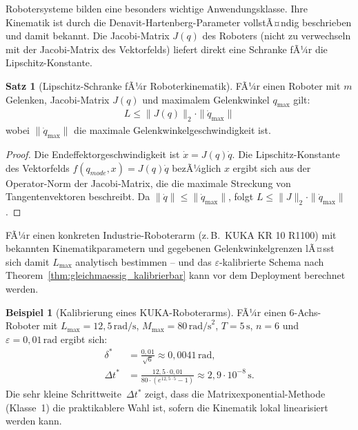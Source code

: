 ﻿\documentclass[a4paper,12pt]{article}
\theoremstyle{definition}
\newtheorem{beispiel}{Beispiel}[section]
\newtheorem{satz}{Satz}[section]
\begin{document}
Robotersysteme bilden eine besonders wichtige Anwendungsklasse. Ihre Kinematik ist durch die Denavit-Hartenberg-Parameter vollstÃ¤ndig beschrieben und damit bekannt. Die Jacobi-Matrix $J(q)$ des Roboters (nicht zu verwechseln mit der Jacobi-Matrix des Vektorfelds) liefert direkt eine Schranke fÃ¼r die Lipschitz-Konstante.

\begin{satz}[Lipschitz-Schranke fÃ¼r Roboterkinematik]
FÃ¼r einen Roboter mit $m$ Gelenken, Jacobi-Matrix $J(q)$ und maximalem Gelenkwinkel $q_{\max}$ gilt:
\begin{align}
  L \leq \|J(q)\|_2 \cdot \|\dot{q}_{\max}\|
\end{align}
wobei $\|\dot{q}_{\max}\|$ die maximale Gelenkwinkelgeschwindigkeit ist.
\end{satz}

\begin{proof}
Die Endeffektorgeschwindigkeit ist $\dot{x} = J(q)\dot{q}$. Die Lipschitz-Konstante des Vektorfelds $f(q_{\mathit{mode}}, x) = J(q)\dot{q}$ bezÃ¼glich $x$ ergibt sich aus der Operator-Norm der Jacobi-Matrix, die die maximale Streckung von Tangentenvektoren beschreibt. Da $\|\dot{q}\| \leq \|\dot{q}_{\max}\|$, folgt $L \leq \|J\|_2 \cdot \|\dot{q}_{\max}\|$.
\end{proof}

FÃ¼r einen konkreten Industrie-Roboterarm (z.\,B.\ KUKA KR 10 R1100) mit bekannten Kinematikparametern und gegebenen Gelenkwinkelgrenzen lÃ¤sst sich damit $L_{\max}$ analytisch bestimmen -- und das $\varepsilon$-kalibrierte Schema nach Theorem~\ref{thm:gleichmaessig_kalibrierbar} kann vor dem Deployment berechnet werden.

\begin{beispiel}[Kalibrierung eines KUKA-Roboterarms]
FÃ¼r einen 6-Achs-Roboter mit $L_{\max} = 12{,}5\,\text{rad/s}$,
$M_{\max} = 80\,\text{rad/s}^2$, $T = 5\,\text{s}$, $n=6$
und $\varepsilon = 0{,}01\,\text{rad}$ ergibt sich:
\begin{align}
  \delta^* &= \frac{0{,}01}{\sqrt{6}} \approx 0{,}0041\,\text{rad}, \\
  \Delta t^* &= \frac{12{,}5 \cdot 0{,}01}{80 \cdot (e^{12{,}5 \cdot 5} - 1)} \approx 2{,}9 \cdot 10^{-8}\,\text{s}.
\end{align}
Die sehr kleine Schrittweite~$\Delta t^*$ zeigt, dass die Matrixexponential-Methode (Klasse~1) die praktikablere Wahl ist, sofern die Kinematik lokal linearisiert werden kann.
\end{beispiel}
\end{document}

